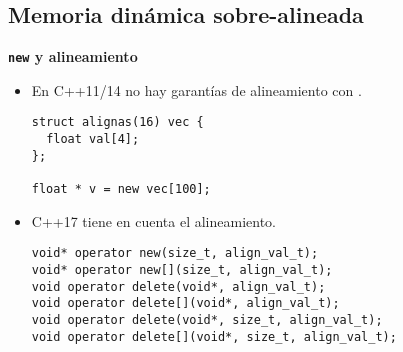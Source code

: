 \subsection{Memoria dinámica sobre-alineada}

\begin{frame}[t,fragile]{\bf\texttt{new} y alineamiento}
\begin{itemize}
  \item En C++11/14 no hay garantías de alineamiento con .
\begin{lstlisting}
struct alignas(16) vec {
  float val[4];
};

float * v = new vec[100];
\end{lstlisting}

  \vfill\pause
  \item C++17 tiene en cuenta el alineamiento.
\begin{lstlisting}
void* operator new(size_t, align_val_t);
void* operator new[](size_t, align_val_t);
void operator delete(void*, align_val_t);
void operator delete[](void*, align_val_t);
void operator delete(void*, size_t, align_val_t);
void operator delete[](void*, size_t, align_val_t);
\end{lstlisting}

\end{itemize}
\end{frame}

